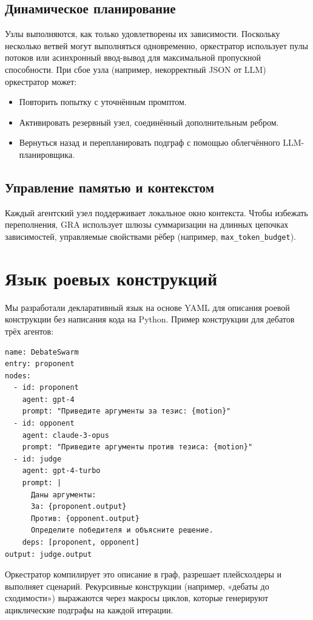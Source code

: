 \documentclass[11pt]{article}
\begin{document}
\subsection{Динамическое планирование}
Узлы выполняются, как только удовлетворены их зависимости.
Поскольку несколько ветвей могут выполняться одновременно, оркестратор использует пулы потоков или асинхронный ввод-вывод для максимальной пропускной способности.
При сбое узла (например, некорректный JSON от LLM) оркестратор может:
\begin{itemize}
    \item Повторить попытку с уточнённым промптом.
    \item Активировать резервный узел, соединённый дополнительным ребром.
    \item Вернуться назад и перепланировать подграф с помощью облегчённого LLM-планировщика.
\end{itemize}

\subsection{Управление памятью и контекстом}
Каждый агентский узел поддерживает локальное окно контекста.
Чтобы избежать переполнения, GRA использует шлюзы суммаризации на длинных цепочках зависимостей, управляемые свойствами рёбер (например, \texttt{max\_token\_budget}).

\section{Язык роевых конструкций}
Мы разработали декларативный язык на основе YAML для описания роевой конструкции без написания кода на Python.
Пример конструкции для дебатов трёх агентов:

\begin{verbatim}
name: DebateSwarm
entry: proponent
nodes:
  - id: proponent
    agent: gpt-4
    prompt: "Приведите аргументы за тезис: {motion}"
  - id: opponent
    agent: claude-3-opus
    prompt: "Приведите аргументы против тезиса: {motion}"
  - id: judge
    agent: gpt-4-turbo
    prompt: |
      Даны аргументы:
      За: {proponent.output}
      Против: {opponent.output}
      Определите победителя и объясните решение.
    deps: [proponent, opponent]
output: judge.output
\end{verbatim}

Оркестратор компилирует это описание в граф, разрешает плейсхолдеры и выполняет сценарий.
Рекурсивные конструкции (например, «дебаты до сходимости») выражаются через макросы циклов, которые генерируют ациклические подграфы на каждой итерации.
\end{document}
